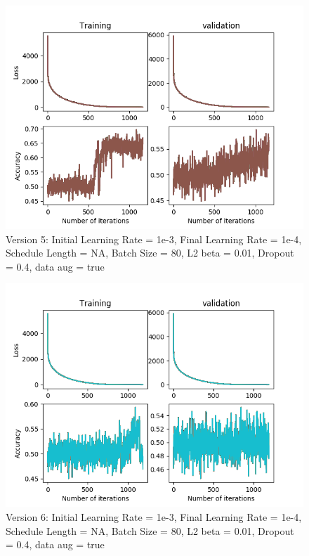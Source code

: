 \documentclass[12pt,reqno]{amsart}
\numberwithin{equation}{section}
\begin{document}
\begin{enumerate}
\begin{figure}[H]
\centering
\includegraphics[scale=0.6]{data12_version5_step0}
\caption{Version 5: Initial Learning Rate = 1e-3, Final Learning Rate = 1e-4, Schedule Length = NA, Batch Size = 80, L2 beta = 0.01, Dropout = 0.4, data aug = true}
\end{figure}

\begin{figure}[H]
\centering
\includegraphics[scale=0.6]{data12_version6_step0}
\caption{Version 6: Initial Learning Rate = 1e-3, Final Learning Rate = 1e-4, Schedule Length = NA, Batch Size = 80, L2 beta = 0.01, Dropout = 0.4, data aug = true}
\end{figure}


\end{enumerate}
\end{document}

